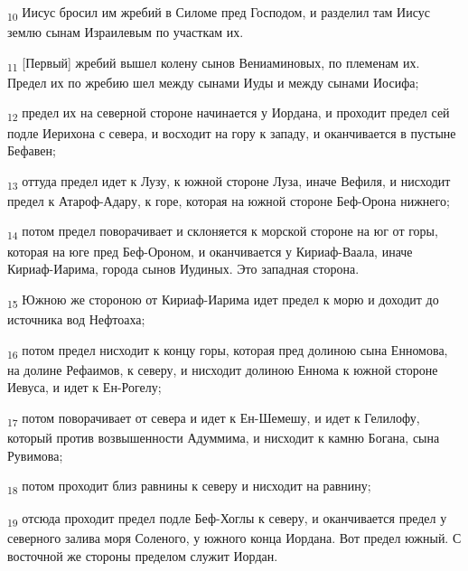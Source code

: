 \begin{tcolorbox}
\textsubscript{10} Иисус бросил им жребий в Силоме пред Господом, и разделил там Иисус землю сынам Израилевым по участкам их.
\end{tcolorbox}
\begin{tcolorbox}
\textsubscript{11} [Первый] жребий вышел колену сынов Вениаминовых, по племенам их. Предел их по жребию шел между сынами Иуды и между сынами Иосифа;
\end{tcolorbox}
\begin{tcolorbox}
\textsubscript{12} предел их на северной стороне начинается у Иордана, и проходит предел сей подле Иерихона с севера, и восходит на гору к западу, и оканчивается в пустыне Бефавен;
\end{tcolorbox}
\begin{tcolorbox}
\textsubscript{13} оттуда предел идет к Лузу, к южной стороне Луза, иначе Вефиля, и нисходит предел к Атароф-Адару, к горе, которая на южной стороне Беф-Орона нижнего;
\end{tcolorbox}
\begin{tcolorbox}
\textsubscript{14} потом предел поворачивает и склоняется к морской стороне на юг от горы, которая на юге пред Беф-Ороном, и оканчивается у Кириаф-Ваала, иначе Кириаф-Иарима, города сынов Иудиных. Это западная сторона.
\end{tcolorbox}
\begin{tcolorbox}
\textsubscript{15} Южною же стороною от Кириаф-Иарима идет предел к морю и доходит до источника вод Нефтоаха;
\end{tcolorbox}
\begin{tcolorbox}
\textsubscript{16} потом предел нисходит к концу горы, которая пред долиною сына Енномова, на долине Рефаимов, к северу, и нисходит долиною Еннома к южной стороне Иевуса, и идет к Ен-Рогелу;
\end{tcolorbox}
\begin{tcolorbox}
\textsubscript{17} потом поворачивает от севера и идет к Ен-Шемешу, и идет к Гелилофу, который против возвышенности Адуммима, и нисходит к камню Богана, сына Рувимова;
\end{tcolorbox}
\begin{tcolorbox}
\textsubscript{18} потом проходит близ равнины к северу и нисходит на равнину;
\end{tcolorbox}
\begin{tcolorbox}
\textsubscript{19} отсюда проходит предел подле Беф-Хоглы к северу, и оканчивается предел у северного залива моря Соленого, у южного конца Иордана. Вот предел южный. С восточной же стороны пределом служит Иордан.
\end{tcolorbox}

